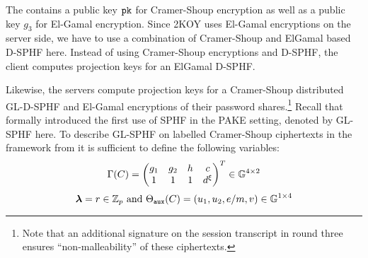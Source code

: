 The \crs contains a public key $\mathtt{pk}$ for Cramer-Shoup encryption as well as a public key $g_3$ for El-Gamal encryption.
Since 2KOY uses El-Gamal encryptions on the server side, we have to use a combination of Cramer-Shoup and ElGamal based \ac{D-SPHF} here.
Instead of using Cramer-Shoup encryptions and \ac{D-SPHF}, the client computes projection keys for an ElGamal \ac{D-SPHF}.

Likewise, the servers compute projection keys for a Cramer-Shoup distributed GL-D-SPHF and El-Gamal encryptions of their password shares.\footnote{Note that an additional signature on the session transcript in round three ensures ``non-malleability'' of these ciphertexts.}
Recall that \citet{Gennaro2003} formally introduced the first use of \ac{SPHF} in the \ac{PAKE} setting, denoted by GL-\ac{SPHF} here.
To describe GL-\ac{SPHF} on labelled Cramer-Shoup ciphertexts in the framework from \cite{cryptoeprint:2013:034} it is sufficient to define the following variables:
\[
\Gamma(C)=
\begin{pmatrix}
g_1 & g_2 & h & c \\
1 & 1 & 1 &  d^\xi
\end{pmatrix}^T \in \mathbb{G}^{4\times 2}
\]
\[
{\bm \lambda}=r\in\mathbb{Z}_p \text{ and } \Theta_\mathtt{aux}(C)=(u_1,u_2,e/m,v)\in\mathbb{G}^{1\times 4}
\]
% 	
% 	
% 	

